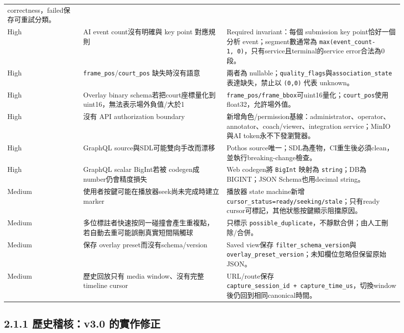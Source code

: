 \documentclass[
  9pt,
  a4paper,
]{article}
\begin{document}
\begin{longtable}[]{@{}>{\RaggedRight\arraybackslash}p{0.18\linewidth}>{\RaggedRight\arraybackslash}p{0.34\linewidth}>{\RaggedRight\arraybackslash}p{0.42\linewidth}@{}}
correctness，failed保存可重試分類。 \\
High & AI event count沒有明確與 key point 對應規則 & Required
invariant：每個 submission key point恰好一個分析 event；segment數通常為
\texttt{max(event\_\allowbreak{}count-1,\ 0)}，只有service且terminal的service
error合法為0段。 \\
High & \texttt{frame\_\allowbreak{}pos}/\texttt{court\_\allowbreak{}pos} 缺失時沒有語意 & 兩者為
nullable；\texttt{quality\_\allowbreak{}flags}與\texttt{association\_\allowbreak{}state}表達缺失，禁止以
\texttt{(0,0)} 代表 unknown。 \\
High & Overlay binary
schema若把court座標量化到uint16，無法表示場外負值/大於1 &
\texttt{frame\_\allowbreak{}pos/frame\_\allowbreak{}bbox}可uint16量化；\texttt{court\_\allowbreak{}pos}使用float32，允許場外值。 \\
High & 沒有 API authorization boundary &
新增角色/permission基線：administrator、operator、annotator、coach/viewer、integration
service；MinIO與AI token永不下發瀏覽器。 \\
High & GraphQL source與SDL可能雙向手改而漂移 & Pothos
source唯一；SDL為產物，CI重生後必須clean，並執行breaking-change檢查。 \\
High & GraphQL scalar BigInt若被 codegen成number仍會精度損失 & Web
codegen將 \texttt{BigInt} 映射為 \texttt{string}；DB為BIGINT；JSON
Schema也用decimal string。 \\
Medium & 使用者按鍵可能在播放器seek尚未完成時建立marker & 播放器 state
machine新增 \texttt{cursor\_\allowbreak{}status=ready/seeking/stale}；只有ready
cursor可標記，其他狀態按鍵顯示阻擋原因。 \\
Medium &
多位標註者快速按同一碰撞會產生重複點，若自動去重可能誤刪真實短間隔觸球 &
只標示 \texttt{possible\_\allowbreak{}duplicate}，不靜默合併；由人工刪除/合併。 \\
Medium & 保存 overlay preset而沒有schema/version & Saved view保存
\texttt{filter\_\allowbreak{}schema\_\allowbreak{}version}與\texttt{overlay\_\allowbreak{}preset\_\allowbreak{}version}；未知欄位忽略但保留原始JSON。 \\
Medium & 歷史回放只有 media window、沒有完整 timeline cursor &
URL/route保存
\texttt{capture\_\allowbreak{}session\_\allowbreak{}id\ +\ capture\_\allowbreak{}time\_\allowbreak{}us}，切換window後仍回到相同canonical時間。 \\
\end{longtable}

\subsection{2.1.1 歷史稽核：v3.0
的實作修正}\label{211-ux6b77ux53f2ux7a3dux6838v30-ux7684ux5be6ux4f5cux4feeux6b63}
\end{document}
